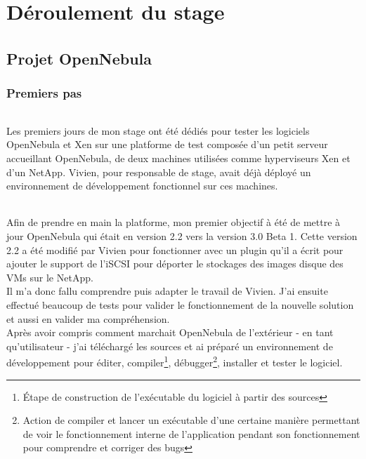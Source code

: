 \part{Déroulement du stage}

\paragraph*{}
\lipsum[1]


\chapter{Projet OpenNebula}

\section{Premiers pas}

\paragraph*{}
Les premiers jours de mon stage ont été dédiés pour tester les logiciels OpenNebula et Xen sur une platforme de test
composée d'un petit serveur accueillant OpenNebula, de deux machines utilisées comme hyperviseurs Xen et d'un NetApp.
Vivien, pour responsable de stage, avait déjà déployé un environnement de développement fonctionnel sur ces machines.

\paragraph*{}
Afin de prendre en main la platforme, mon premier objectif à été de mettre à jour OpenNebula qui était en version 2.2 vers la version 3.0 Beta 1.
Cette version 2.2 a été modifié par Vivien pour fonctionner avec un plugin qu'il a écrit pour ajouter le support de l'iSCSI pour déporter le stockages des images
disque des VMs sur le NetApp.
\\
Il m'a donc fallu comprendre puis adapter le travail de Vivien. J'ai ensuite effectué beaucoup de tests pour valider le fonctionnement
de la nouvelle solution et aussi en valider ma compréhension.
\\
Après avoir compris comment marchait OpenNebula de l'extérieur - en tant qu'utilisateur - j'ai téléchargé les sources et ai préparé un
environnement de développement pour éditer, compiler\footnote{Étape de construction de l'exécutable du logiciel à partir des sources},
débugger\footnote{Action de compiler et lancer un exécutable d'une certaine manière permettant de voir le fonctionnement interne de l'application
pendant son fonctionnement pour comprendre et corriger des bugs}, installer et tester le logiciel.

